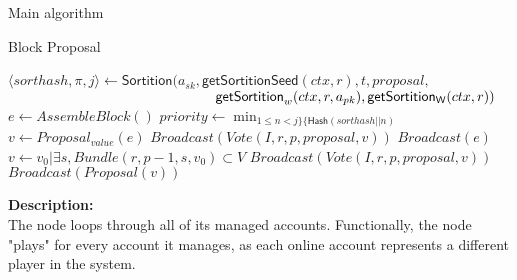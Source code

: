 \documentclass[10pt,a4paper]{article}
\begin{document}
\begin{section}{Main algorithm}
\begin{subsection}{Block Proposal}\label{ssect:blockproposal}

    \begin{algorithm}
        \begin{algorithmic}[1]

                \State $\langle sorthash, \pi, j\rangle\gets 
                \mathsf{Sortition}(
                    a_{sk}, 
                    \mathsf{getSortitionSeed}(ctx, r), 
                    t, 
                    proposal, $ \newline
                    ${}$ ${\hskip 5.2cm}\mathsf{getSortition}_w(ctx, r, a_{pk}), 
                    \mathsf{getSortition_W}(ctx, r)
                )$
                        \State $e \gets AssembleBlock()$
                        \State $priority \gets \min_{1\le n < j\}\{\mathsf{Hash}(sorthash || n)}$
                        \State $v \gets Proposal_{value}(e)$
                        \State $Broadcast(Vote(I, r, p, proposal, v))$
                        \State $Broadcast(e)$
                    \Else
                        \State $v \gets v_0 | \exists s, Bundle(r,p-1,s,v_0) \subset V$
                        \State $Broadcast(Vote(I, r, p, proposal, v))$
                            \State $Broadcast(Proposal(v))$
                        \EndIf
                    \EndIf
                \EndIf
            \EndFor
        \EndFunction
        \end{algorithmic}
        \caption{\underline{Block proposal}}
    \end{algorithm}

\newpage
\noindent \textbf{Description:}\\
The node loops through all of its managed accounts. Functionally, the node "plays"
for every account it manages, as each online account represents a different player
in the system.


\end{subsection}
\end{section}
\end{document}
